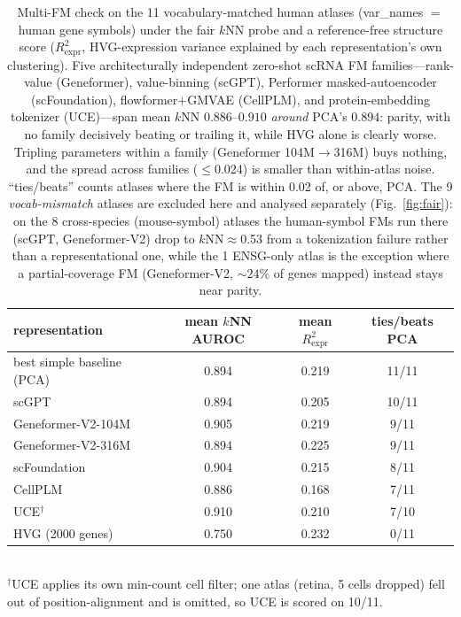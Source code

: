 \documentclass[fleqn,10pt,lineno]{wlpeerj}  %
\begin{document}
\begin{table}[!ht]\centering\footnotesize
\caption{Multi-FM check on the 11 vocabulary-matched human atlases (var\_names $=$ human gene symbols) under the fair $k$NN probe and a reference-free structure score ($R^2_{\mathrm{expr}}$, HVG-expression variance explained by each representation's own clustering). Five architecturally independent zero-shot scRNA FM families---rank-value (Geneformer), value-binning (scGPT), Performer masked-autoencoder (scFoundation), flowformer$+$GMVAE (CellPLM), and protein-embedding tokenizer (UCE)---span mean $k$NN $0.886$--$0.910$ \emph{around} PCA's $0.894$: parity, with no family decisively beating or trailing it, while HVG alone is clearly worse. Tripling parameters within a family (Geneformer 104M$\to$316M) buys nothing, and the spread across families ($\le$0.024) is smaller than within-atlas noise. ``ties/beats'' counts atlases where the FM is within 0.02 of, or above, PCA. The 9 \emph{vocab-mismatch} atlases are excluded here and analysed separately (Fig.~\ref{fig:fair}): on the 8 cross-species (mouse-symbol) atlases the human-symbol FMs run there (scGPT, Geneformer-V2) drop to $k$NN${\approx}$0.53 from a tokenization failure rather than a representational one, while the 1 ENSG-only atlas is the exception where a partial-coverage FM (Geneformer-V2, ${\sim}24\%$ of genes mapped) instead stays near parity.}
\label{tab:fmscale}
\begin{tabular}{@{}lccc@{}}
\toprule
representation & mean $k$NN AUROC & mean $R^2_{\mathrm{expr}}$ & ties/beats PCA \\
\midrule
best simple baseline (PCA) & 0.894 & 0.219 & 11/11 \\
scGPT & 0.894 & 0.205 & 10/11 \\
Geneformer-V2-104M & 0.905 & 0.219 & 9/11 \\
Geneformer-V2-316M & 0.894 & 0.225 & 9/11 \\
scFoundation & 0.904 & 0.215 & 8/11 \\
CellPLM & 0.886 & 0.168 & 7/11 \\
UCE$^{\dagger}$ & 0.910 & 0.210 & 7/10 \\
HVG (2000 genes) & 0.750 & 0.232 & 0/11 \\
\bottomrule
\end{tabular}\\[2pt]
{\footnotesize $^{\dagger}$UCE applies its own min-count cell filter; one atlas (retina, 5 cells dropped) fell out of position-alignment and is omitted, so UCE is scored on 10/11.}
\end{table}
\end{document}
